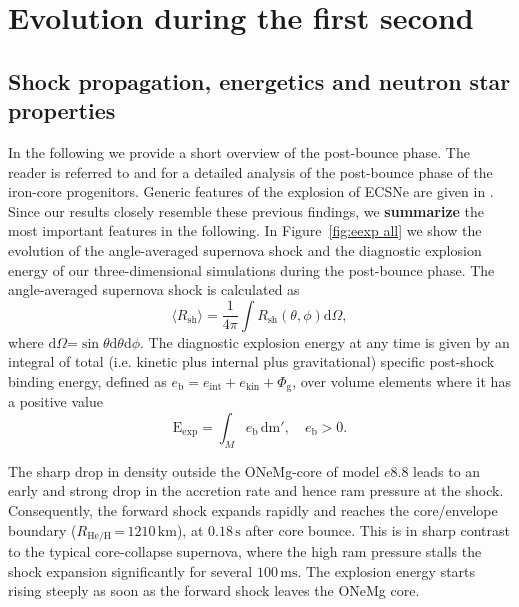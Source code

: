 \documentclass[fleqn,usenatbib]{mnras}
\newcommand{\ud}{\ensuremath{\mathrm{d}}\xspace}
\newcommand{\s}{\ensuremath{\text{s}}}
\begin{document}
\section{Evolution during the first second}
\label{sec:Evolution during the first second}
\subsection{Shock propagation, energetics and neutron star properties}
In the following we provide a short overview of the post-bounce phase. The reader is referred to \cite{Melson2015a} and \cite{Melson2019} for a detailed analysis of the post-bounce phase of the iron-core progenitors. Generic features of the explosion of ECSNe are given in \cite{Kitaura2006,Janka2008,Gessner2018}. Since our results closely resemble these previous findings, we \textbf{summarize} the most important features in the following.
In Figure~\ref{fig:eexp all} we show the evolution of the angle-averaged supernova shock and the diagnostic explosion energy of our three-dimensional simulations during the post-bounce phase. 
The angle-averaged supernova shock is calculated as
\begin{equation}
    \langle R_{\mathrm{sh}} \rangle =  \frac{1}{4\pi}\int R_{\mathrm{sh}}(\theta,\phi)\ud \Omega,
    \label{equ:avg rsh}
\end{equation}
where $\ud \Omega\mathord{=}\sin{\theta}\ud\theta\ud\phi$.
The diagnostic explosion energy at any time is given by an integral of total (i.e. kinetic plus internal plus gravitational) specific post-shock binding energy, defined as $e_{\text{b}} = e_{\mathrm{int}} + e_{\mathrm{kin}} + \Phi_{\text{g}}$, over volume elements where it has a positive value 
\begin{equation}
    \mathrm{E}_{\mathrm{exp}} = \int_{M} e_{\mathrm{b}} \, \mathrm{dm'},\quad e_{\mathrm{b}} > 0.
    \label{equ:ene exp}
\end{equation}

The sharp drop in density outside the ONeMg-core of model $e8.8$ leads to an early and strong drop in the accretion rate and hence ram pressure at the shock.
Consequently, the forward shock expands rapidly and reaches the core/envelope boundary ($R_{\mathrm{He/H}}\,\mathord{=}\,1210\,\text{km}$), at $0.18\,\s$ after core bounce.
This is in sharp contrast to the typical core-collapse supernova, where the high ram pressure stalls the shock expansion significantly for several $100\,\text{ms}$. The explosion energy starts rising steeply as soon as the forward shock leaves the ONeMg core.
\end{document}
